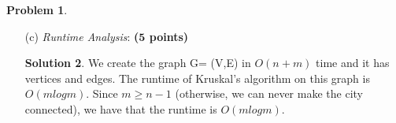 \documentclass{article}
\theoremstyle{definition}
\newtheorem{problem}{Problem}
\newtheorem*{solution*}{Solution}
\newenvironment{solution}{\begin{solution*}}{{} \end{solution*}}
\newcommand{\grade}[1]{\hfill{\textbf{($\mathbf{#1}$ points)}}}
\begin{document}
\begin{problem}
\begin{enumerate}
\begin{solution}
\end{solution}


\bigskip


	\item[(c)] \emph{Runtime Analysis}: \grade{5} 
	
	
\begin{solution}

		We create the graph G= (V,E) in $O(n+m)$ time and it has vertices and edges. The runtime of Kruskal’s algorithm on this graph is $O(mlogm)$.  Since $m \geq n-1$ (otherwise, we can never make the city connected), we have that the runtime is $O(mlogm)$. \\

\end{solution}

\end{enumerate}
	
	
\end{problem}
\newpage
\end{document}
